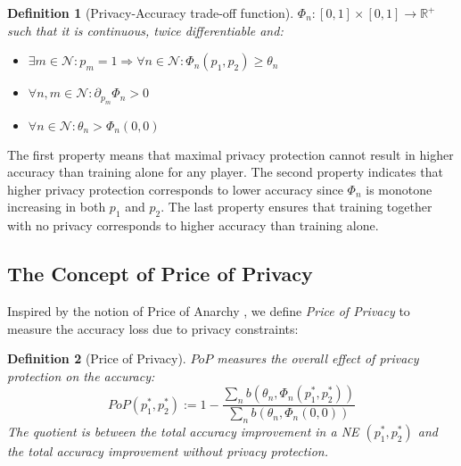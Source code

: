 \documentclass[USenglish,oneside,twocolumn]{article}
\theoremstyle{plain}
\newtheorem{definition}{Definition}
\begin{document}
    \vspace{-0.25cm}
    \begin{definition}[Privacy-Accuracy trade-off function]
        \label{def:phi}
        $\Phi_n:[0,1]\times[0,1]\rightarrow\mathbb{R}^+$ such that it is continuous, twice differentiable and:
        \begin{itemize}
            \item $\exists m\in\mathcal{N}:p_m=1\Rightarrow\forall n\in\mathcal{N}:\Phi_n(p_1,p_2)\geq\theta_n$
            \item $\forall n,m\in\mathcal{N}: \partial_{p_m}\Phi_n>0$
            \item $\forall n\in\mathcal{N}: \theta_n>\Phi_n(0,0)$
        \end{itemize}
    \end{definition}
    \vspace{-0.25cm}
    
    The first property means that maximal privacy protection cannot result in higher accuracy than training alone for any player. The second property indicates that higher privacy protection corresponds to lower accuracy since $\Phi_n$ is monotone increasing in both $p_1$ and $p_2$. The last property ensures that training together with no privacy corresponds to higher accuracy than training alone.
    
    \vspace{-0.5cm}
    \subsection{The Concept of Price of Privacy}
    \vspace{-0.25cm}
    
    Inspired by the notion of Price of Anarchy \cite{koutsoupias1999worst}, we define \textit{Price of Privacy} to measure the accuracy loss due to privacy constraints:
    
    \vspace{-0.25cm}
    \begin{definition}[Price of Privacy]
        \label{def:pop}
        $PoP$ measures the overall effect of privacy protection on the accuracy: 
        \vspace{-0.1cm}
        \begin{equation}
        \label{eq:pop}	PoP(p_1^*,p_2^*):=1-\frac{\sum_nb(\theta_n,\Phi_n(p_1^*,p_2^*))}{\sum_nb(\theta_n,\Phi_n(0,0))}
        \end{equation}
        The quotient is between the total accuracy improvement in a NE $(p_1^*,p_2^*)$ and the total accuracy improvement without privacy protection.
    \end{definition}
    \vspace{-0.25cm}
    
\end{document}
